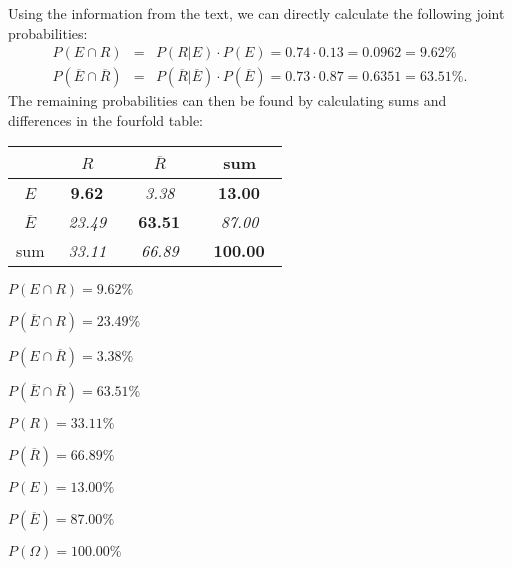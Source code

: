\begin{solution}
Using the information from the text, we can directly calculate the following joint probabilities:
\begin{eqnarray*}
  P(E \cap R) & = &
    P(R | E) \cdot P(E) = 0.74 \cdot 0.13 = 0.0962 = 9.62\%\\
  P(\overline{E} \cap \overline{R}) & = &
    P(\overline{R} | \overline{E}) \cdot P(\overline{E}) = 0.73 \cdot 0.87 = 0.6351 = 63.51\%.
\end{eqnarray*}
The remaining probabilities can then be found by calculating sums and differences in the fourfold table:

\begin{tabular}{|c|cc|c|}
\hline
                 & ~$R$~                    & ~$\overline{R}$~         & sum \\ \hline
~$E$~            & ~\bf   9.62~ & ~\it   3.38~ & ~\bf  13.00~ \\
~$\overline{E}$~ & ~\it  23.49~ & ~\bf  63.51~ & ~\it  87.00~ \\ \hline
sum              & ~\it  33.11~ & ~\it  66.89~ & ~\bf 100.00~ \\
\hline
\end{tabular}

\begin{answerlist}
  \item $P(E \cap R) =   9.62\%$
  \item $P(\overline{E} \cap R) =  23.49\%$
  \item $P(E \cap \overline{R}) =   3.38\%$
  \item $P(\overline{E} \cap \overline{R}) =  63.51\%$
  \item $P(R) =  33.11\%$
  \item $P(\overline{R}) =  66.89\%$
  \item $P(E) =  13.00\%$
  \item $P(\overline{E}) =  87.00\%$
  \item $P(\Omega) = 100.00\%$
\end{answerlist}
\end{solution}


